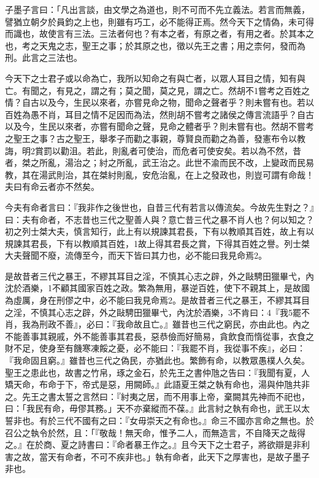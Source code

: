 
\begin{pinyinscope}
子墨子言曰：「凡出言談，由文學之為道也，則不可而不先立義法。若言而無義，譬猶立朝夕於員鈞之上也，則雖有巧工，必不能得正焉。然今天下之情偽，未可得而識也，故使言有三法。三法者何也？有本之者，有原之者，有用之者。於其本之也，考之天鬼之志，聖王之事；於其原之也，徵以先王之書；用之柰何，發而為刑。此言之三法也。

今天下之士君子或以命為亡，我所以知命之有與亡者，以眾人耳目之情，知有與亡。有聞之，有見之，謂之有；莫之聞，莫之見，謂之亡。然胡不1嘗考之百姓之情？自古以及今，生民以來者，亦嘗見命之物，聞命之聲者乎？則未嘗有也。若以百姓為愚不肖，耳目之情不足因而為法，然則胡不嘗考之諸侯之傳言流語乎？自古以及今，生民以來者，亦嘗有聞命之聲，見命之體者乎？則未嘗有也。然胡不嘗考之聖王之事？古之聖王，舉孝子而勸之事親，尊賢良而勸之為善，發憲布令以教誨，明2賞罰以勸沮。若此，則亂者可使治，而危者可使安矣。若以為不然，昔者，桀之所亂，湯治之；紂之所亂，武王治之。此世不渝而民不改，上變政而民易教，其在湯武則治，其在桀紂則亂，安危治亂，在上之發政也，則豈可謂有命哉！夫曰有命云者亦不然矣。

今夫有命者言曰：『我非作之後世也，自昔三代有若言以傳流矣。今故先生對之？』曰：夫有命者，不志昔也三代之聖善人與？意亡昔三代之暴不肖人也？何以知之？初之列士桀大夫，慎言知行，此上有以規諫其君長，下有以教順其百姓，故上有以規諫其君長，下有以教順其百姓，1故上得其君長之賞，下得其百姓之譽。列士桀大夫聲聞不廢，流傳至今，而天下皆曰其力也，必不能曰我見命焉2。

是故昔者三代之暴王，不繆其耳目之淫，不慎其心志之辟，外之敺騁田獵畢弋，內沈於酒樂，1不顧其國家百姓之政。繁為無用，暴逆百姓，使下不親其上，是故國為虛厲，身在刑僇之中，必不能曰我見命焉2。是故昔者三代之暴王，不繆其耳目之淫，不慎其心志之辟，外之敺騁田獵畢弋，內沈於酒樂，3不肯曰：4『我5罷不肖，我為刑政不善』，必曰：『我命故且亡。』雖昔也三代之窮民，亦由此也。內之不能善事其親戚，外不能善事其君長，惡恭儉而好簡易，貪飲食而惰從事，衣食之財不足，使身至有饑寒凍餒之憂，必不能曰：『我罷不肖，我從事不疾』，必曰：『我命固且窮。』雖昔也三代之偽民，亦猶此也。繁飾有命，以教眾愚樸人久矣。聖王之患此也，故書之竹帛，琢之金石，於先王之書仲虺之告曰：『我聞有夏，人矯天命，布命于下，帝式是惡，用闕師。』此語夏王桀之執有命也，湯與仲虺共非之。先王之書太誓之言然曰：『紂夷之居，而不用事上帝，棄闕其先神而不祀也，曰：「我民有命，毋僇其務。」天不亦棄縱而不葆。』此言紂之執有命也，武王以太誓非也。有於三代不國有之曰：『女毋崇天之有命也。』命三不國亦言命之無也。於召公之執令於然，且：「『敬哉！無天命，惟予二人，而無造言，不自降天之哉得之。』在於商、夏之詩書曰：『命者暴王作之。』且今天下之士君子，將欲辯是非利害之故，當天有命者，不可不疾非也。」執有命者，此天下之厚害也，是故子墨子非也。


\end{pinyinscope}